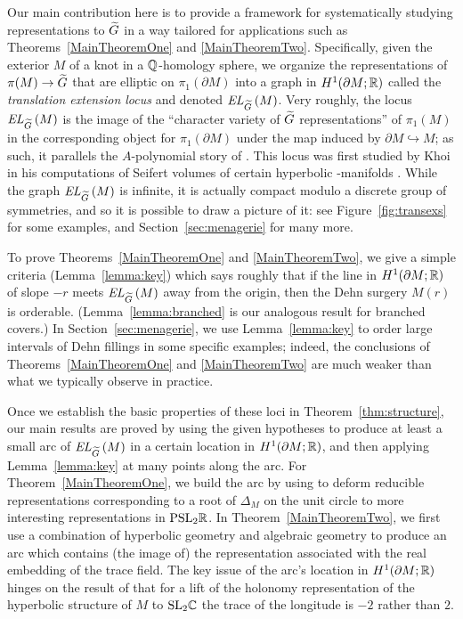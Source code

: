 \documentclass[tikz, sepfignums, defaultenums]{nmd/article}
\newcommand{\TEL}[1]{\mathit{EL}_\Gtil\left(#1\right)}
\begin{document}
Our main contribution here is to provide a framework for
systematically studying representations to $\Gtil$ in a way tailored
for applications such as Theorems~\ref{MainTheoremOne} and
\ref{MainTheoremTwo}.  Specifically, given the exterior $M$ of a knot
in a ${\mathbb Q}$-homology sphere, we organize the representations of
$\pi(M) \to \Gtil $ that are elliptic on $\pi_1(\partial M)$ into a
graph in $H^1(\partial M; {\mathbb R})$ called the \emph{translation extension
  locus} and denoted $\TEL{M}$.  Very roughly, the locus $\TEL{M}$ is
the image of the ``character variety of $\Gtil $ representations'' of
$\pi_1(M)$ in the corresponding object for $\pi_1(\partial M)$ under
the map induced by $\partial M \hookrightarrow M$; as such, it
parallels the $A$-polynomial story of \cite{CCGLS}.  This locus was
first studied by Khoi in his computations of Seifert volumes of
certain hyperbolic \3-manifolds \cite{Khoi2003}.  While the graph
$\TEL{M}$ is infinite, it is actually compact modulo a discrete group
of symmetries, and so it is possible to draw a picture of it: see
Figure~\ref{fig:transexs} for some examples, and
Section~\ref{sec:menagerie} for many more.

To prove Theorems~\ref{MainTheoremOne} and \ref{MainTheoremTwo}, we
give a simple criteria (Lemma~\ref{lemma:key}) which says roughly that
if the line in $H^1(\partial M; {\mathbb R})$ of slope $-r$ meets $\TEL{M}$
away from the origin, then the Dehn surgery $M(r)$ is orderable.
(Lemma~\ref{lemma:branched} is our analogous result for branched
covers.)  In Section~\ref{sec:menagerie}, we use Lemma~\ref{lemma:key}
to order large intervals of Dehn fillings in some specific examples;
indeed, the conclusions of Theorems~\ref{MainTheoremOne} and
\ref{MainTheoremTwo} are much weaker than what we typically observe in
practice.

Once we establish the basic properties of these loci in
Theorem~\ref{thm:structure}, our main results are proved by using the
given hypotheses to produce at least a small arc of $\TEL{M}$ in a
certain location in $H^1(\partial M; {\mathbb R})$, and then applying
Lemma~\ref{lemma:key} at many points along the arc.  For
Theorem~\ref{MainTheoremOne}, we build the arc by using
\cite{HeusenerPorti2005} to deform reducible representations
corresponding to a root of $\Delta_M$ on the unit circle to more
interesting representations in $\mathrm{PSL}_{2} {\mathbb R}$.  In
Theorem~\ref{MainTheoremTwo}, we first use a combination of hyperbolic
geometry and algebraic geometry to produce an arc which contains (the
image of) the representation associated with the real embedding of the
trace field. The key issue of the arc's location in
$H^1(\partial M; {\mathbb R})$ hinges on the result of \cite[Corollary
2.4]{Calegari2006} that for a lift of the holonomy representation of
the hyperbolic structure of $M$ to $\mathrm{ SL}_{2} {\mathbb C}$ the trace of the
longitude is $-2$ rather than $2$.
\end{document}
